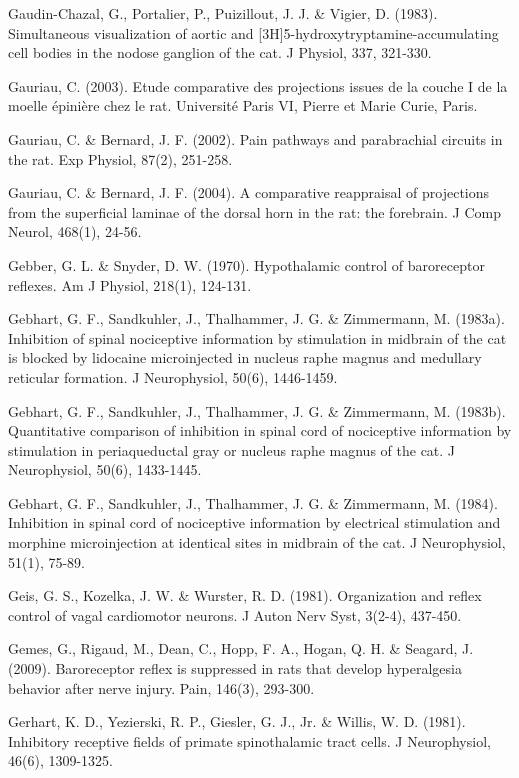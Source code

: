 \documentclass[a4paper,12pt,twoside]{report}
\begin{document}
\begin{singlespacing}
\begin{footnotesize}
Gaudin-Chazal, G., Portalier, P., Puizillout, J. J. \& Vigier, D. (1983). Simultaneous visualization of aortic and [3H]5-hydroxytryptamine-accumulating cell bodies in the nodose ganglion of the cat. J Physiol, 337, 321-330.

Gauriau, C. (2003). Etude comparative des projections issues de la couche I de la moelle épinière chez le rat. Université Paris VI, Pierre et Marie Curie, Paris.

Gauriau, C. \& Bernard, J. F. (2002). Pain pathways and parabrachial circuits in the rat. Exp Physiol, 87(2), 251-258.

Gauriau, C. \& Bernard, J. F. (2004). A comparative reappraisal of projections from the superficial laminae of the dorsal horn in the rat: the forebrain. J Comp Neurol, 468(1), 24-56.

Gebber, G. L. \& Snyder, D. W. (1970). Hypothalamic control of baroreceptor reflexes. Am J Physiol, 218(1), 124-131.

Gebhart, G. F., Sandkuhler, J., Thalhammer, J. G. \& Zimmermann, M. (1983a). Inhibition of spinal nociceptive information by stimulation in midbrain of the cat is blocked by lidocaine microinjected in nucleus raphe magnus and medullary reticular formation. J Neurophysiol, 50(6), 1446-1459.

Gebhart, G. F., Sandkuhler, J., Thalhammer, J. G. \& Zimmermann, M. (1983b). Quantitative comparison of inhibition in spinal cord of nociceptive information by stimulation in periaqueductal gray or nucleus raphe magnus of the cat. J Neurophysiol, 50(6), 1433-1445.

Gebhart, G. F., Sandkuhler, J., Thalhammer, J. G. \& Zimmermann, M. (1984). Inhibition in spinal cord of nociceptive information by electrical stimulation and morphine microinjection at identical sites in midbrain of the cat. J Neurophysiol, 51(1), 75-89.

Geis, G. S., Kozelka, J. W. \& Wurster, R. D. (1981). Organization and reflex control of vagal cardiomotor neurons. J Auton Nerv Syst, 3(2-4), 437-450.

Gemes, G., Rigaud, M., Dean, C., Hopp, F. A., Hogan, Q. H. \& Seagard, J. (2009). Baroreceptor reflex is suppressed in rats that develop hyperalgesia behavior after nerve injury. Pain, 146(3), 293-300.

Gerhart, K. D., Yezierski, R. P., Giesler, G. J., Jr. \& Willis, W. D. (1981). Inhibitory receptive fields of primate spinothalamic tract cells. J Neurophysiol, 46(6), 1309-1325.


\end{footnotesize}
\end{singlespacing}
\end{document}
